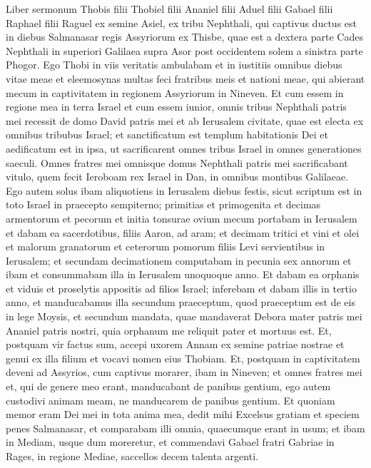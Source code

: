 \begin{biblechapter}
 \verse Liber sermonum Thobis filii Thobiel filii Ananiel filii Aduel filii Gabael filii Raphael filii Raguel ex semine Asiel, ex tribu Nephthali, 
\verse qui captivus ductus est in diebus Salmanasar regis Assyriorum ex Thisbe, quae est a dextera parte Cades Nephthali in superiori Galilaea supra Asor post occidentem solem a sinistra parte Phogor.
 \verse Ego Thobi in viis veritatis ambulabam et in iustitiis omnibus diebus vitae meae et eleemosynas multas feci fratribus meis et nationi meae, qui abierant mecum in captivitatem in regionem Assyriorum in Nineven. 
\verse Et cum essem in regione mea in terra Israel et cum essem iunior, omnis tribus Nephthali patris mei recessit de domo David patris mei et ab Ierusalem civitate, quae est electa ex omnibus tribubus Israel; et sanctificatum est templum habitationis Dei et aedificatum est in ipsa, ut sacrificarent omnes tribus Israel in omnes generationes saeculi. 
\verse Omnes fratres mei omnisque domus Nephthali patris mei sacrificabant vitulo, quem fecit Ieroboam rex Israel in Dan, in omnibus montibus Galilaeae. 
\verse Ego autem solus ibam aliquotiens in Ierusalem diebus festis, sicut scriptum est in toto Israel in praecepto sempiterno; primitias et primogenita et decimas armentorum et pecorum et initia tonsurae ovium mecum portabam in Ierusalem 
\verse et dabam ea sacerdotibus, filiis Aaron, ad aram; et decimam tritici et vini et olei et malorum granatorum et ceterorum pomorum filiis Levi servientibus in Ierusalem; et secundam decimationem computabam in pecunia sex annorum et ibam et consummabam illa in Ierusalem unoquoque anno. 
 \verse Et dabam ea orphanis et viduis et proselytis appositis ad filios Israel; inferebam et dabam illis in tertio anno, et manducabamus illa secundum praeceptum, quod praeceptum est de eis in lege Moysis, et secundum mandata, quae mandaverat Debora mater patris mei Ananiel patris nostri, quia orphanum me reliquit pater et mortuus est. 
\verse Et, postquam vir factus sum, accepi uxorem Annam ex semine patriae nostrae et genui ex illa filium et vocavi nomen eius Thobiam. 
\verse Et, postquam in captivitatem deveni ad Assyrios, cum captivus morarer, ibam in Nineven; et omnes fratres mei et, qui de genere meo erant, manducabant de panibus gentium, 
\verse ego autem custodivi animam meam, ne manducarem de panibus gentium. 
\verse Et quoniam memor eram Dei mei in tota anima mea, 
\verse dedit mihi Excelsus gratiam et speciem penes Salmanasar, et comparabam illi omnia, quaecumque erant in usum; 
\verse et ibam in Mediam, usque dum moreretur, et commendavi Gabael fratri Gabriae in Rages, in regione Mediae, saccellos decem talenta argenti.

\end{biblechapter}
